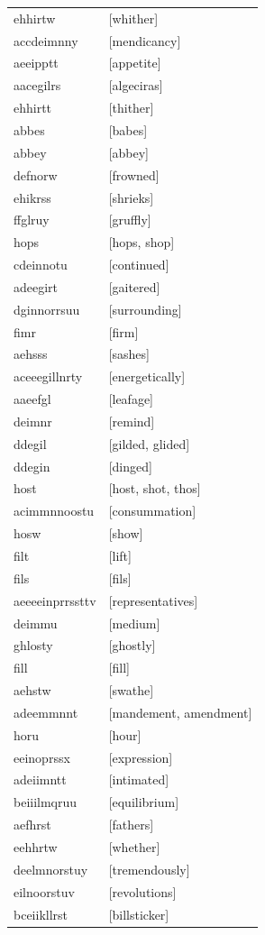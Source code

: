 \documentclass{article}
\begin{document}
\begin{tabular}{ll}
ehhirtw & [whither] \\
accdeimnny & [mendicancy] \\
aeeipptt & [appetite] \\
aacegilrs & [algeciras] \\
ehhirtt & [thither] \\
abbes & [babes] \\
abbey & [abbey] \\
defnorw & [frowned] \\
ehikrss & [shrieks] \\
ffglruy & [gruffly] \\
hops & [hops, shop] \\
cdeinnotu & [continued] \\
adeegirt & [gaitered] \\
dginnorrsuu & [surrounding] \\
fimr & [firm] \\
aehsss & [sashes] \\
aceeegillnrty & [energetically] \\
aaeefgl & [leafage] \\
deimnr & [remind] \\
ddegil & [gilded, glided] \\
ddegin & [dinged] \\
host & [host, shot, thos] \\
acimmnnoostu & [consummation] \\
hosw & [show] \\
filt & [lift] \\
fils & [fils] \\
aeeeeinprrssttv & [representatives] \\
deimmu & [medium] \\
ghlosty & [ghostly] \\
fill & [fill] \\
aehstw & [swathe] \\
adeemmnnt & [mandement, amendment] \\
horu & [hour] \\
eeinoprssx & [expression] \\
adeiimntt & [intimated] \\
beiiilmqruu & [equilibrium] \\
aefhrst & [fathers] \\
eehhrtw & [whether] \\
deelmnorstuy & [tremendously] \\
eilnoorstuv & [revolutions] \\
bceiikllrst & [billsticker] \\

\end{tabular}
\end{document}
